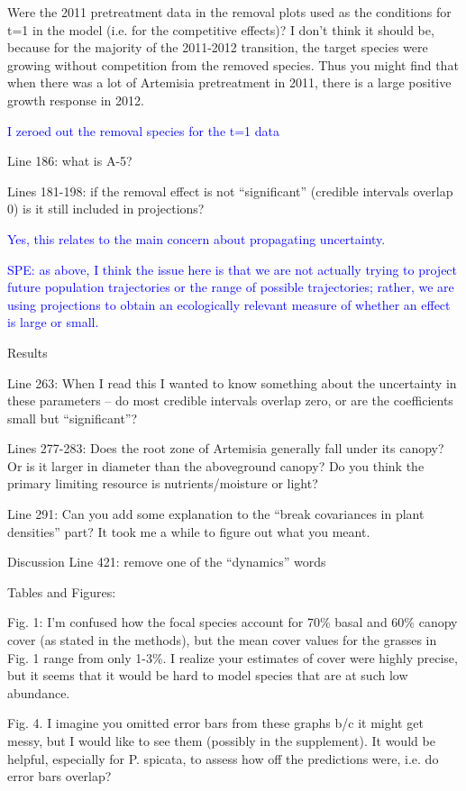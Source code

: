 \documentclass[12pt]{article}
\newcommand{\response}{\textcolor{blue}}
\begin{document}
{Were the 2011 pretreatment data in the removal plots used as the conditions for t=1 in the model (i.e. for the competitive effects)? I don’t think it should be, because for the majority of the 2011-2012 transition, the target species were growing without competition from the removed species. Thus you might find that when there was a lot of Artemisia pretreatment in 2011, there is a large positive growth response in 2012.

\response{I zeroed out the removal species for the t=1 data}

Line 186: what is A-5?

Lines 181-198: if the removal effect is not “significant” (credible intervals overlap 0) is it still included in projections?

\response{Yes, this relates to the main concern about propagating uncertainty.}

\response{SPE: as above, I think the issue here is that we are not actually trying to project future population trajectories or the range of possible trajectories; rather, we are
using projections to obtain an ecologically relevant measure of whether an effect is large or small.} 

Results

Line 263:  When I read this I wanted to know something about the uncertainty in these parameters – do most credible intervals overlap zero, or are the coefficients small but “significant”?

Lines 277-283: Does the root zone of Artemisia generally fall under its canopy? Or is it larger in diameter than the aboveground canopy? Do you think the primary limiting resource is nutrients/moisture or light?

Line 291: Can you add some explanation to the “break covariances in plant densities” part? It took me a while to figure out what you meant. 

Discussion
Line 421: remove one of the “dynamics” words 

Tables and Figures:

Fig. 1: I’m confused how the focal species account for 70\% basal and 60\% canopy cover (as stated in the methods), but the mean cover values for the grasses in Fig. 1 range from only 1-3\%. I realize your estimates of cover were highly precise, but it seems that it would be hard to model species that are at such low abundance.

Fig. 4. I imagine you omitted error bars from these graphs b/c it might get messy, but I would like to see them (possibly in the supplement). It would be helpful, especially for P. spicata, to assess how off the predictions were, i.e. do error bars overlap?

}
\end{document}

